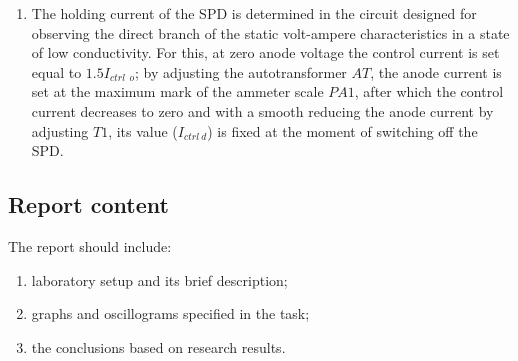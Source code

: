 \documentclass[a4paper,14pt]{article}
\begin{document}
\begin{enumerate}
If the class turns out to be less than the third, for a more complete use of devices, division into classes
produced in 0.5.


\item The holding current of the SPD is determined in the circuit designed for observing the direct 
branch of the static volt-ampere
characteristics in a state of low conductivity. For this, at zero anode voltage
the control current is set equal to $1.5 I_{ctrl\:\:o}$; by adjusting the autotransformer $AT$, 
the anode current is set
at the maximum mark of the ammeter scale $PA1$, after which the control current decreases to zero and with a smooth
reducing the anode current by adjusting $T1$, its value ($I_{ctrl\: d}$) is fixed at the moment 
of switching off the SPD.
\end{enumerate}

\subsection{Report content}

The report should include:
\begin{enumerate}
\item laboratory setup and its brief description;
\item graphs and oscillograms specified in the task;
\item the conclusions based on research results.
\end{enumerate}
\end{document}
